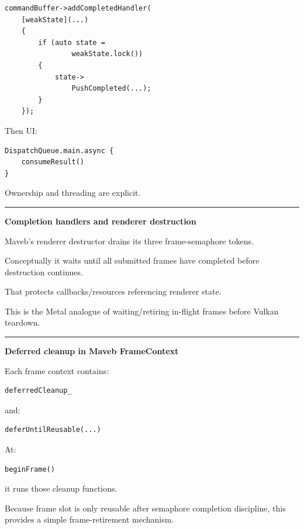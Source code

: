 \begin{verbatim}
commandBuffer->addCompletedHandler(
    [weakState](...)
    {
        if (auto state =
                weakState.lock())
        {
            state->
                PushCompleted(...);
        }
    });
\end{verbatim}

Then UI:

\begin{verbatim}
DispatchQueue.main.async {
    consumeResult()
}
\end{verbatim}

Ownership and threading are explicit.

\begin{center}\rule{0.5\linewidth}{0.5pt}\end{center}

\textbf{Completion handlers and renderer destruction}

Maveb's renderer destructor drains its three frame-semaphore tokens.

Conceptually it waits until all submitted frames have completed before destruction continues.

That protects callbacks/resources referencing renderer state.

This is the Metal analogue of waiting/retiring in-flight frames before Vulkan teardown.

\begin{center}\rule{0.5\linewidth}{0.5pt}\end{center}

\textbf{Deferred cleanup in Maveb FrameContext}

Each frame context contains:

\begin{verbatim}
deferredCleanup_
\end{verbatim}

and:

\begin{verbatim}
deferUntilReusable(...)
\end{verbatim}

At:

\begin{verbatim}
beginFrame()
\end{verbatim}

it runs those cleanup functions.

Because frame slot is only reusable after semaphore completion discipline, this provides a simple frame-retirement mechanism.


